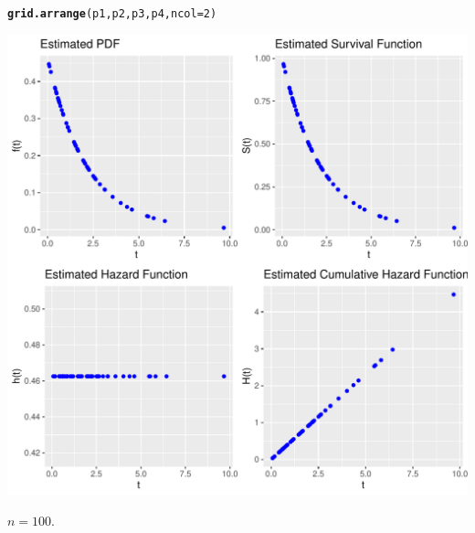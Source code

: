 \documentclass[11pt, a4paper]{article}\usepackage[]{graphicx}\usepackage[]{xcolor}
\makeatletter
\def\maxwidth{ %
  \ifdim\Gin@nat@width>\linewidth
    \linewidth
  \else
    \Gin@nat@width
  \fi
}
\newcommand{\hlnum}[1]{\textcolor[rgb]{0.686,0.059,0.569}{#1}}%
\newcommand{\hldef}[1]{\textcolor[rgb]{0.345,0.345,0.345}{#1}}%
\newcommand{\hlkwc}[1]{\textcolor[rgb]{0.333,0.667,0.333}{#1}}%
\newcommand{\hlkwd}[1]{\textcolor[rgb]{0.737,0.353,0.396}{\textbf{#1}}}%
\newenvironment{kframe}{%
 \def\at@end@of@kframe{}%
 \ifinner\ifhmode%
  \def\at@end@of@kframe{\end{minipage}}%
  \begin{minipage}{\columnwidth}%
 \fi\fi%
 \def\FrameCommand##1{\hskip\@totalleftmargin \hskip-\fboxsep
 \colorbox{shadecolor}{##1}\hskip-\fboxsep
     \hskip-\linewidth \hskip-\@totalleftmargin \hskip\columnwidth}%
 \MakeFramed {\advance\hsize-\width
   \@totalleftmargin\z@ \linewidth\hsize
   \@setminipage}}%
 {\par\unskip\endMakeFramed%
 \at@end@of@kframe}
\newenvironment{knitrout}{}{} %
\makeatother
\begin{document}
\begin{knitrout}
\color{fgcolor}\begin{kframe}
\begin{alltt}
\hlkwd{grid.arrange}\hldef{(p1, p2, p3, p4,} \hlkwc{ncol} \hldef{=} \hlnum{2}\hldef{)}
\end{alltt}
\end{kframe}
\includegraphics[width=\maxwidth]{figure/unnamed-chunk-19-1} 
\end{knitrout}


\newpage

 $n = 100$.
\end{document}
